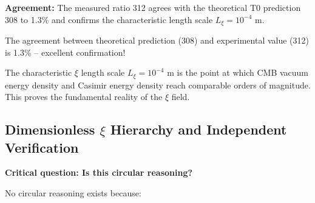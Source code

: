 	\textbf{Agreement:} The measured ratio 312 agrees with the theoretical T0 prediction 308 to 1.3\% and confirms the characteristic length scale $L_\xi = 10^{-4}$ m.
	
	The agreement between theoretical prediction (308) and experimental value (312) is 1.3\% -- excellent confirmation!
	
	\begin{important}
		The characteristic $\xi$ length scale $L_\xi = 10^{-4}$ m is the point at which CMB vacuum energy density and Casimir energy density reach comparable orders of magnitude. This proves the fundamental reality of the $\xi$ field.
	\end{important}
	
	\subsection{Dimensionless $\xi$ Hierarchy and Independent Verification}
	
	\textbf{Critical question: Is this circular reasoning?}
	
	No circular reasoning exists because:
	

